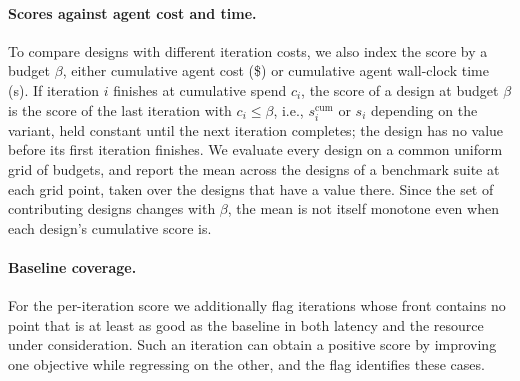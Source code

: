 \paragraph{Scores against agent cost and time.}
To compare designs with different iteration costs, we also index the score by a
budget $\beta$, either cumulative agent cost (\$) or cumulative agent wall-clock
time (s). If iteration $i$ finishes at cumulative spend $c_i$, the score of a
design at budget $\beta$ is the score of the last iteration with $c_i \le \beta$,
i.e., $s^{\mathrm{cum}}_{i}$ or $s_{i}$ depending on the variant, held constant
until the next iteration completes; the design has no value before its first
iteration finishes. We evaluate every design on a common uniform grid of
budgets, and report the mean across the designs of a benchmark suite at each
grid point, taken over the designs that have a value there. Since the set of
contributing designs changes with $\beta$, the mean is not itself monotone even
when each design's cumulative score is.

\paragraph{Baseline coverage.}
For the per-iteration score we additionally flag iterations whose front
contains no point that is at least as good as the baseline in both latency and
the resource under consideration. Such an iteration can obtain a positive
score by improving one objective while regressing on the other, and the flag
identifies these cases.
